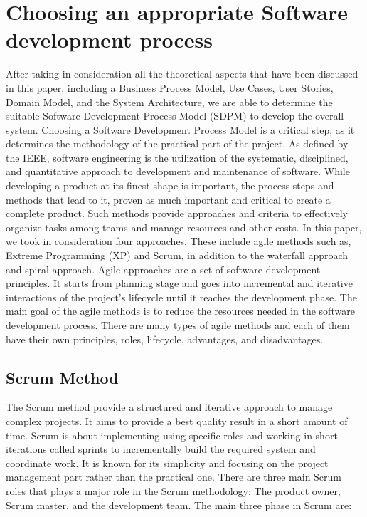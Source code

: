 \documentclass[conference,onecolumn]{IEEEtran}
\begin{document}
\section{Choosing an appropriate Software development process}

	After taking in consideration all the theoretical aspects that have been discussed in this paper, including a Business Process Model, Use Cases, User Stories, Domain Model, and the System Architecture, we are able to determine the suitable Software Development Process Model (SDPM) to develop the overall system. Choosing a Software Development Process Model is a critical step, as it determines the methodology of the practical part of the project.
	As defined by the IEEE, software engineering is the utilization of the systematic, disciplined, and quantitative approach to development and maintenance of software. While developing a product at its finest shape is important, the process steps and methods that lead to it, proven as much important and critical to create a complete product. Such methods provide approaches and criteria to effectively organize tasks among teams and manage resources and other costs.  In this paper, we took in consideration four approaches. These include agile methods such as, Extreme Programming (XP) and Scrum, in addition to the waterfall approach and spiral approach.
	Agile approaches are a set of software development principles. It starts from planning stage and goes into incremental and iterative interactions of the project’s lifecycle until it reaches the development phase. The main goal of the agile methods is to reduce the resources needed in the software development process. There are many types of agile methods and each of them have their own principles, roles, lifecycle, advantages, and disadvantages.

	\subsection{Scrum Method}
	The Scrum method provide a structured and iterative approach to manage complex projects. It aims to provide a best quality result in a short amount of time. Scrum is about implementing using specific roles and working in short iterations called sprints to incrementally build the required system and coordinate work. It is known for its simplicity and focusing on the project management part rather than the practical one. There are three main Scrum roles that plays a major role in the Scrum methodology: The product owner, Scrum master, and the development team.
	The main three phase in Scrum are:
\end{document}
